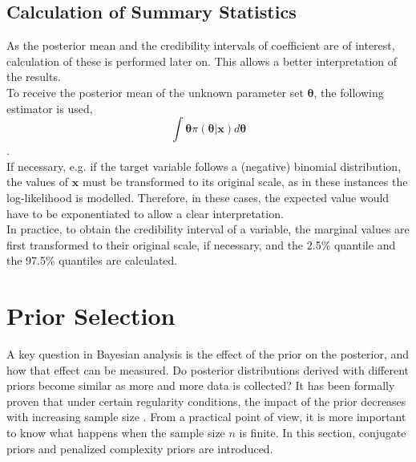 \subsection{Calculation of Summary Statistics}\label{sec:mean_iv}
As the posterior mean and the credibility intervals of coefficient are of interest, calculation of these is performed later on. This allows a better interpretation of the results. \\
To receive the posterior mean of the unknown parameter set $\pmb{\theta}$, the following estimator is used,
\begin{equation}
    \int \pmb{\theta}\pi\left(\pmb{\theta}|\pmb{x}\right)d\pmb{\theta}
\end{equation}
\autocite[][]{jaynes2003probability}.\\
If necessary, e.g. if the target variable follows a (negative) binomial distribution, the values of $\pmb{x}$ must be transformed to its original scale, as in these instances the log-likelihood is modelled. Therefore, in these cases, the expected value would have to be exponentiated to allow a clear interpretation. \\
In practice, to obtain the credibility interval of a variable, the marginal values are first transformed to their original scale, if necessary, and the 2.5\% quantile and the 97.5\% quantiles are calculated.
\clearpage
\section{Prior Selection}
A key question in Bayesian analysis is the effect of the prior on the posterior, and how that effect can be measured. Do posterior distributions derived with different priors become similar as more and more data is collected? It has been formally proven that under certain regularity conditions, the impact of the prior decreases with increasing sample size \autocite[][]{ghaderinezhad2019impact}. From a practical point of view, it is more important to know what happens when the sample size $n$ is finite. In this section, conjugate priors and penalized complexity priors are introduced. 
